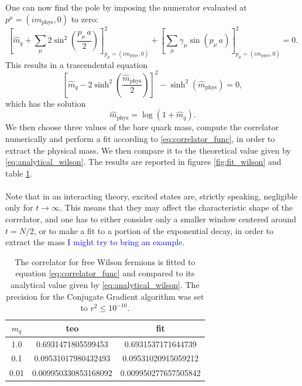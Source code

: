 One can now find the pole by imposing the numerator evaluated at $p^\mu =(im_\text{phys}, 0)$ to zero:
\begin{equation*}
    \left[\hat{m}_q + \sum_\mu 2 \sin ^2\left(\frac{p_\mu \, a}{2}\right)\right]^2_{p_\mu = (im_\text{phys}, 0)} + \left[\sum_\mu \gamma_\mu \sin \left(p_\mu \, a\right)\right]^2_{p_\mu = (im_\text{phys}, 0)} = 0.
\end{equation*}
This results in a trascendental equation 
\begin{equation*}
    \left[\hat{m}_q - 2 \sinh^2\left(\frac{\hat{m}_\text{phys}}{2}\right)\right]^2 - \sinh^2\left(\hat{m}_\text{phys}\right) = 0,
\end{equation*}
which has the solution 
\begin{equation}
    \hat{m}_\text{phys} = \log\left(1+\hat{m}_q\right).
    \label{eq:analytical_wilson}
\end{equation}
We then choose three values of the bare quark mass, compute the correlator numerically and perform a fit according to \eqref{eq:correlator_func}, in order to extract the physical mass. We then compare it to the theoretical value given by \eqref{eq:analytical_wilson}. The results are reported in figures \ref{fig:fit_wilson} and table \ref{tab:free_wilson_fit}. \\~\\
Note that in an interacting theory, excited states are, strictly speaking, negligible only for $t \to \infty$. This means that they may affect the characteristic shape of the correlator, and one has to either consider only a smaller window centered around $t=N/2$, or to make a fit to a portion of the exponential decay, in order to extract the mass \textcolor{blue}{I might try to bring an example}.
\newpage
\begin{table}[h!]
    \centering
    \begin{tabular}[pos]{ccc}
        \toprule
        $m_q$ & teo & fit \\
        \midrule 
        1.0 & 0.6931471805599453 & 0.6931537171644739 \\
        0.1 & 0.09531017980432493 & 0.09531020915059212 \\
        0.01 & 0.009950330853168092 & 0.009950277657505842 \\
        \bottomrule
    \end{tabular}
    \caption[Fit of the correlator for free Wilson fermions.]{The correlator for free Wilson fermions is fitted to equation \eqref{eq:correlator_func} and compared to its analytical value given by \eqref{eq:analytical_wilson}. The precision for the Conjugate Gradient algorithm was set to $r^2 \leq 10^{-10}$.}
    \label{tab:free_wilson_fit}
\end{table}
